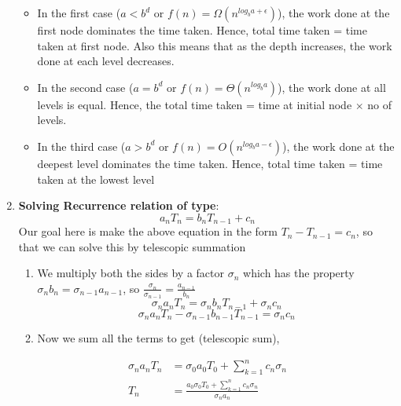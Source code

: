 \documentclass{article}
\begin{document}
\begin{enumerate}
		\begin{itemize}
		\item In the first case ($a<b^d\text{ or }f(n)= \Omega(n^{log_ba+\epsilon})$), the work done at the first node dominates the time taken. Hence, total time taken = time taken at first node. Also this means that as the depth increases, the work done at each level decreases. 
		\item In the second case ($a=b^d\text{ or }f(n)= \Theta(n^{log_ba})$), the work done at all levels is equal. Hence, the total time taken = time at initial node $\times$ no of levels.
		\item In the third case ($a>b^d\text{ or }f(n)= O(n^{log_ba-\epsilon})$), the work done at the deepest level dominates the time taken. Hence, total time taken = time taken at the lowest level
		\end{itemize}

		\item \textbf{Solving Recurrence relation  of type}:
			\[a_n T_n = b_n T_{n-1} + c_n\]
		Our goal here is make the above equation in the form $T_n - T_{n-1} = c_n$, so that we can solve this by telescopic summation
		\begin{enumerate}
			\item We multiply both the sides by a factor $\sigma_n$ which has the property $\sigma_n b_n = \sigma_{n-1} a_{n-1}$, so $\frac{\sigma_n}{\sigma_{n-1}}= \frac{a_{n-1}}{b_n}$
			\[\sigma_n a_n T_n = \sigma_n b_n T_{n-1} + \sigma_n c_n \]
			\[\sigma_n a_n T_n - \sigma_{n-1} b_{n-1} T_{n-1} = \sigma_n c_n\]
			\item Now we sum all the terms to get (telescopic sum),
		\end{enumerate}
		\begin{align*}
			\sigma_n a_n T_n &= \sigma_0 a_0 T_0 + \sum_{k=1}^n c_n \sigma_n\\
					T_n &= \frac{ a_0 \sigma_0 T_0 + \sum_{k=1}^n c_n \sigma_n}{\sigma_n a_n} 
		\end{align*}


\end{enumerate}
\end{document}
